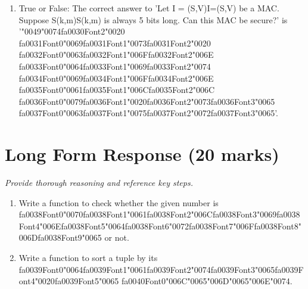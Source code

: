 \documentclass[12pt]{article}
\begin{document}
\begin{enumerate}[label=\arabic*.]
\item True or False: The correct answer to 'Let I = (S,V)I=(S,V) be a MAC. Suppose S(k,m)S(k,m) is always 5 bits long. Can this MAC be secure?' is '{\char"0049}{\char"0074}{\csname fa0030Font2\endcsname\char"0020} {\csname fa0031Font0\endcsname\char"0069}{\csname fa0031Font1\endcsname\char"0073}{\csname fa0031Font2\endcsname\char"0020} {\csname fa0032Font0\endcsname\char"0063}{\csname fa0032Font1\endcsname\char"006F}{\csname fa0032Font2\endcsname\char"006E} {\csname fa0033Font0\endcsname\char"0064}{\csname fa0033Font1\endcsname\char"0069}{\csname fa0033Font2\endcsname\char"0074} {\csname fa0034Font0\endcsname\char"0069}{\csname fa0034Font1\endcsname\char"006F}{\csname fa0034Font2\endcsname\char"006E} {\csname fa0035Font0\endcsname\char"0061}{\csname fa0035Font1\endcsname\char"006C}{\csname fa0035Font2\endcsname\char"006C} {\csname fa0036Font0\endcsname\char"0079}{\csname fa0036Font1\endcsname\char"0020}{\csname fa0036Font2\endcsname\char"0073}{\csname fa0036Font3\endcsname\char"0065} {\csname fa0037Font0\endcsname\char"0063}{\csname fa0037Font1\endcsname\char"0075}{\csname fa0037Font2\endcsname\char"0072}{\csname fa0037Font3\endcsname\char"0065}'.
\end{enumerate}

\section*{Long Form Response (20 marks)}
\textit{Provide thorough reasoning and reference key steps.}
\begin{enumerate}[label=\arabic*.]
\item Write a function to check whether the given number is {\csname fa0038Font0\endcsname\char"0070}{\csname fa0038Font1\endcsname\char"0061}{\csname fa0038Font2\endcsname\char"006C}{\csname fa0038Font3\endcsname\char"0069}{\csname fa0038Font4\endcsname\char"006E}{\csname fa0038Font5\endcsname\char"0064}{\csname fa0038Font6\endcsname\char"0072}{\csname fa0038Font7\endcsname\char"006F}{\csname fa0038Font8\endcsname\char"006D}{\csname fa0038Font9\endcsname\char"0065} or not.
\item Write a function to sort a tuple by its {\csname fa0039Font0\endcsname\char"0064}{\csname fa0039Font1\endcsname\char"0061}{\csname fa0039Font2\endcsname\char"0074}{\csname fa0039Font3\endcsname\char"0065}{\csname fa0039Font4\endcsname\char"0020}{\csname fa0039Font5\endcsname\char"0065} {\csname fa0040Font0\endcsname\char"006C}{\char"0065}{\char"006D}{\char"0065}{\char"006E}{\char"0074}.
\end{enumerate}
\end{document}
